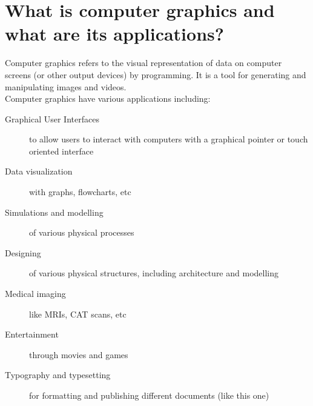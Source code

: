 \section{What is computer graphics and what are its applications?}

Computer graphics refers to the visual representation of data on computer
screens (or other output devices) by programming. It is a tool for generating
and manipulating images and videos.\\
Computer graphics have various applications including:
\begin{description}
  \item [Graphical User Interfaces] {to allow users to interact with computers
      with a graphical pointer or touch oriented interface}
  \item [Data visualization] {with graphs, flowcharts, etc}
  \item [Simulations and modelling] {of various physical processes}
  \item [Designing] {of various physical structures, including architecture and
      modelling}
  \item [Medical imaging] {like MRIs, CAT scans, etc}
  \item [Entertainment] {through movies and games}
  \item [Typography and typesetting] {for formatting and publishing different
      documents (like this one)}
\end{description}
